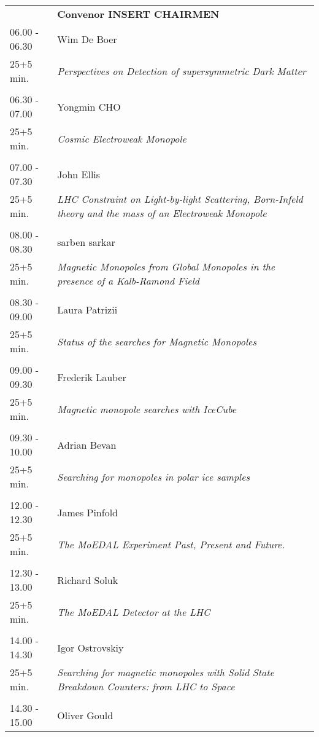 \begin{longtable}{p{3cm}p{13cm}}
&\hfill {\bf Convenor INSERT CHAIRMEN }\\ 
06.00 - 06.30 & Wim De Boer\\ 
25+5 min. & {\it Perspectives on Detection of  supersymmetric Dark Matter}\\ 
 & \\ 
06.30 - 07.00 & Yongmin CHO\\ 
25+5 min. & {\it Cosmic Electroweak Monopole}\\ 
 & \\ 
07.00 - 07.30 & John Ellis\\ 
25+5 min. & {\it LHC Constraint on Light-by-light Scattering, Born-Infeld theory and the mass of an Electroweak Monopole}\\ 
 & \\ 
08.00 - 08.30 & sarben sarkar\\ 
25+5 min. & {\it Magnetic Monopoles from Global Monopoles in the presence of a Kalb-Ramond Field}\\ 
 & \\ 
08.30 - 09.00 & Laura Patrizii\\ 
25+5 min. & {\it Status of the searches for Magnetic Monopoles}\\ 
 & \\ 
09.00 - 09.30 & Frederik Lauber\\ 
25+5 min. & {\it Magnetic monopole searches with IceCube}\\ 
 & \\ 
09.30 - 10.00 & Adrian Bevan\\ 
25+5 min. & {\it Searching for monopoles in polar ice samples}\\ 
 & \\ 
12.00 - 12.30 & James Pinfold\\ 
25+5 min. & {\it The MoEDAL Experiment Past, Present and Future.}\\ 
 & \\ 
12.30 - 13.00 & Richard Soluk\\ 
25+5 min. & {\it The MoEDAL Detector at the LHC}\\ 
 & \\ 
14.00 - 14.30 & Igor Ostrovskiy\\ 
25+5 min. & {\it Searching for magnetic monopoles with Solid State Breakdown Counters: from LHC to Space}\\ 
 & \\ 
14.30 - 15.00 & Oliver Gould\\ 

\end{longtable}
